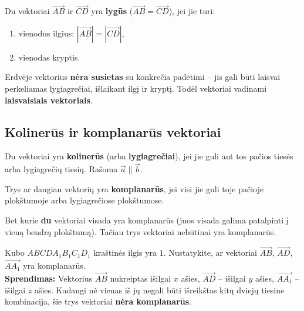 \begin{definition}
Du vektoriai $\overrightarrow{AB}$ ir $\overrightarrow{CD}$ yra \textbf{lygūs} 
($\overrightarrow{AB} = \overrightarrow{CD}$), jei jie turi:
\begin{enumerate}[label=\arabic*.]
    \item vienodus ilgius: $|\overrightarrow{AB}| = |\overrightarrow{CD}|$,
    \item vienodas kryptis.
\end{enumerate}
\end{definition}

\begin{remark}
Erdvėje vektorius \textbf{nėra susietas} su konkrečia padėtimi -- jis gali būti laisvai 
perkeliamas lygiagrečiai, išlaikant ilgį ir kryptį. Todėl vektoriai vadinami 
\textbf{laisvaisiais vektoriais}.
\end{remark}

\subsection{Kolinerūs ir komplanarūs vektoriai}

\begin{definition}
Du vektoriai yra \textbf{kolinerūs} (arba \textbf{lygiagrečiai}), jei jie guli ant tos 
pačios tiesės arba lygiagrečių tiesių. Rašoma $\vec{a} \parallel \vec{b}$.
\end{definition}

\begin{definition}
Trys ar daugiau vektorių yra \textbf{komplanarūs}, jei visi jie guli toje pačioje 
plokštumoje arba lygiagrečiose plokštumose.
\end{definition}

\begin{remark}
Bet kurie \textbf{du} vektoriai visada yra komplanarūs (juos visada galima patalpinti į 
vieną bendrą plokštumą). Tačiau trys vektoriai nebūtinai yra komplanarūs.
\end{remark}

\begin{example}
Kubo $ABCDA_1B_1C_1D_1$ kraštinės ilgis yra $1$. Nustatykite, ar vektoriai 
$\overrightarrow{AB}$, $\overrightarrow{AD}$, $\overrightarrow{AA_1}$ yra komplanarūs.\\[4pt]
\textbf{Sprendimas:} Vektorius $\overrightarrow{AB}$ nukreiptas išilgai $x$ ašies, 
$\overrightarrow{AD}$ -- išilgai $y$ ašies, $\overrightarrow{AA_1}$ -- išilgai $z$ ašies. 
Kadangi nė vienas iš jų negali būti išreikštas kitų dviejų tiesine kombinacija, šie trys 
vektoriai \textbf{nėra komplanarūs}.
\end{example}

